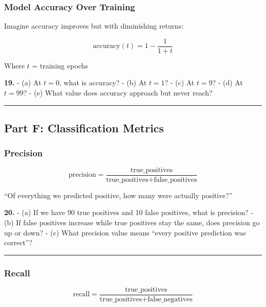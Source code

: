 \documentclass[
  11pt,
]{article}
\begin{document}
\hypertarget{model-accuracy-over-training}{%
\subsubsection{Model Accuracy Over
Training}\label{model-accuracy-over-training}}

Imagine accuracy improves but with diminishing returns:

\[\text{accuracy}(t) = 1 - \dfrac{1}{1 + t}\]

Where \(t\) = training epochs

\textbf{19.} - (a) At \(t = 0\), what is accuracy? - (b) At \(t = 1\)? -
(c) At \(t = 9\)? - (d) At \(t = 99\)? - (e) What value does accuracy
approach but never reach?

\begin{center}\rule{0.5\linewidth}{0.5pt}\end{center}

\hypertarget{part-f-classification-metrics}{%
\subsection{Part F: Classification
Metrics}\label{part-f-classification-metrics}}

\hypertarget{precision}{%
\subsubsection{Precision}\label{precision}}

\[\text{precision} = \dfrac{\text{true\_positives}}{\text{true\_positives} + \text{false\_positives}}\]

``Of everything we predicted positive, how many were actually
positive?''

\textbf{20.} - (a) If we have 90 true positives and 10 false positives,
what is precision? - (b) If false positives increase while true
positives stay the same, does precision go up or down? - (c) What
precision value means ``every positive prediction was correct''?

\begin{center}\rule{0.5\linewidth}{0.5pt}\end{center}

\hypertarget{recall}{%
\subsubsection{Recall}\label{recall}}

\[\text{recall} = \dfrac{\text{true\_positives}}{\text{true\_positives} + \text{false\_negatives}}\]
\end{document}
